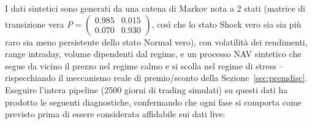 \documentclass[11pt]{article}
\theoremstyle{definition}
\theoremstyle{remark}
\begin{document}
I dati sintetici sono generati da una catena di Markov nota a 2 stati (matrice di transizione vera $P=\left(\begin{smallmatrix}0.985&0.015\\0.070&0.930\end{smallmatrix}\right)$, cos\`i che lo stato Shock vero sia sia pi\`u raro sia meno persistente dello stato Normal vero), con volatilit\`a dei rendimenti, range intraday, volume dipendenti dal regime, e un processo NAV sintetico che segue da vicino il prezzo nel regime calmo e si scolla nel regime di stress -- rispecchiando il meccanismo reale di premio/sconto della Sezione~\ref{sec:premdisc}. Eseguire l'intera pipeline (2500 giorni di trading simulati) su questi dati ha prodotto le seguenti diagnostiche, confermando che ogni fase si comporta come previsto prima di essere considerata affidabile sui dati live:
\end{document}
